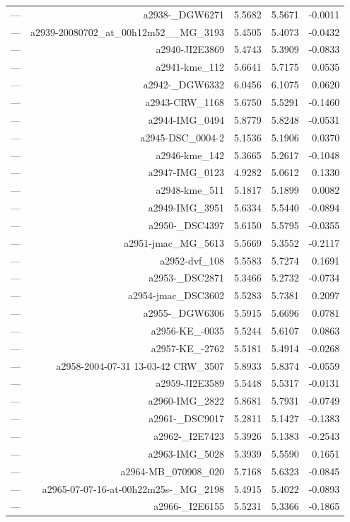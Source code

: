 \begin{table}[htbp]
\begin{tabular}{lrrrr}
— & a2938-_DGW6271 & 5.5682 & 5.5671 & -0.0011 \\
— & a2939-20080702_at_00h12m52__MG_3193 & 5.4505 & 5.4073 & -0.0432 \\
— & a2940-JI2E3869 & 5.4743 & 5.3909 & -0.0833 \\
— & a2941-kme_112 & 5.6641 & 5.7175 & 0.0535 \\
— & a2942-_DGW6332 & 6.0456 & 6.1075 & 0.0620 \\
— & a2943-CRW_1168 & 5.6750 & 5.5291 & -0.1460 \\
— & a2944-IMG_0494 & 5.8779 & 5.8248 & -0.0531 \\
— & a2945-DSC_0004-2 & 5.1536 & 5.1906 & 0.0370 \\
— & a2946-kme_142 & 5.3665 & 5.2617 & -0.1048 \\
— & a2947-IMG_0123 & 4.9282 & 5.0612 & 0.1330 \\
— & a2948-kme_511 & 5.1817 & 5.1899 & 0.0082 \\
— & a2949-IMG_3951 & 5.6334 & 5.5440 & -0.0894 \\
— & a2950-_DSC4397 & 5.6150 & 5.5795 & -0.0355 \\
— & a2951-jmac_MG_5613 & 5.5669 & 5.3552 & -0.2117 \\
— & a2952-dvf_108 & 5.5583 & 5.7274 & 0.1691 \\
— & a2953-_DSC2871 & 5.3466 & 5.2732 & -0.0734 \\
— & a2954-jmac_DSC3602 & 5.5283 & 5.7381 & 0.2097 \\
— & a2955-_DGW6306 & 5.5915 & 5.6696 & 0.0781 \\
— & a2956-KE_-0035 & 5.5244 & 5.6107 & 0.0863 \\
— & a2957-KE_-2762 & 5.5181 & 5.4914 & -0.0268 \\
— & a2958-2004-07-31 13-03-42 CRW_3507 & 5.8933 & 5.8374 & -0.0559 \\
— & a2959-JI2E3589 & 5.5448 & 5.5317 & -0.0131 \\
— & a2960-IMG_2822 & 5.8681 & 5.7931 & -0.0749 \\
— & a2961-_DSC9017 & 5.2811 & 5.1427 & -0.1383 \\
— & a2962-_I2E7423 & 5.3926 & 5.1383 & -0.2543 \\
— & a2963-IMG_5028 & 5.3939 & 5.5590 & 0.1651 \\
— & a2964-MB_070908_020 & 5.7168 & 5.6323 & -0.0845 \\
— & a2965-07-07-16-at-00h22m25s-_MG_2198 & 5.4915 & 5.4022 & -0.0893 \\
— & a2966-_I2E6155 & 5.5231 & 5.3366 & -0.1865 \\

\end{tabular}
\end{table}
